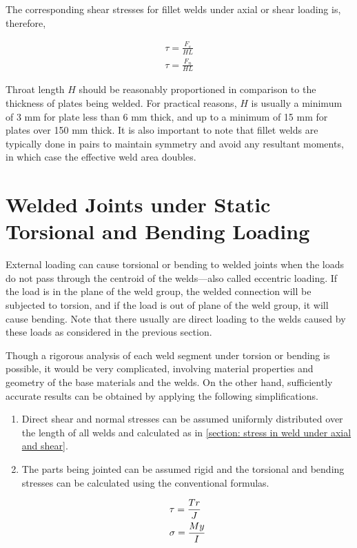 \documentclass[
10pt,
a4paper,
openany,
svgnames,
]{book}
\begin{document}
The corresponding shear stresses for fillet welds under axial or shear loading is, therefore,

\begin{equation}
  \begin{gathered}
    \tau = \frac{F_s}{HL} \\
    \tau = \frac{F_n}{HL}
  \end{gathered}
\end{equation}

Throat length $H$ should be reasonably proportioned in comparison to the thickness of plates being welded. For practical reasons, $H$ is usually a minimum of 3 mm for plate less than 6 mm thick, and up to a minimum of 15 mm for plates over 150 mm thick. It is also important to note that fillet welds are typically done in pairs to maintain symmetry and avoid any resultant moments, in which case the effective weld area doubles.

\section{Welded Joints under Static Torsional and Bending Loading}

External loading can cause torsional or bending to welded joints when the loads do not pass through the centroid of the welds—also called eccentric loading. If the load is in the plane of the weld group, the welded connection will be subjected to torsion, and if the load is out of plane of the weld group, it will cause bending. Note that there usually are direct loading to the welds caused by these loads as considered in the previous section.

Though a rigorous analysis of each weld segment under torsion or bending is possible, it would be very complicated, involving material properties and geometry of the base materials and the welds. On the other hand, sufficiently accurate results can be obtained by applying the following simplifications.
\begin{enumerate}
\item Direct shear and normal stresses can be assumed uniformly distributed over the length of all welds and calculated as in \cref{section: stress in weld under axial and shear}.
\item The parts being jointed can be assumed rigid and the torsional and bending stresses can be calculated using the conventional formulas.
  
  \[\begin{gathered}
    \tau  = \frac{Tr}{J} \hfill \\
    \sigma  = \frac{My}{I} \hfill \\ 
  \end{gathered} \]

\end{enumerate}
\end{document}

